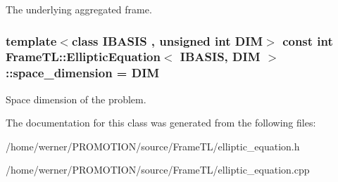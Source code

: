 The underlying aggregated frame. \hypertarget{classFrameTL_1_1EllipticEquation_db618d3531a93bc69d8181064705e6a9}{
\subsubsection[{space\_\-dimension}]{\setlength{\rightskip}{0pt plus 5cm}template$<$class IBASIS , unsigned int DIM$>$ const int {\bf FrameTL::EllipticEquation}$<$ IBASIS, DIM $>$::{\bf space\_\-dimension} = DIM}}
\label{classFrameTL_1_1EllipticEquation_db618d3531a93bc69d8181064705e6a9}


Space dimension of the problem. 

The documentation for this class was generated from the following files:\begin{CompactItemize}
\item 
/home/werner/PROMOTION/source/FrameTL/elliptic\_\-equation.h\item 
/home/werner/PROMOTION/source/FrameTL/elliptic\_\-equation.cpp\end{CompactItemize}
